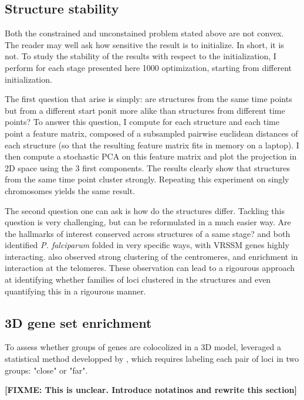 \documentclass[letterpaper,12pt]{article}
\newcommand{\fixme}[1]{\textbf{[FIXME: #1]}}
\begin{document}
\subsection*{Structure stability}

Both the constrained and unconstained problem stated above are not convex. The
reader may well ask how sensitive the result is to initialize. In short, it is
not. To study the stability of the results with respect to the initialization,
I perform for each stage presented here 1000 optimization, starting from
different initialization. 

The first question that arise is simply: are structures from the same time
points but from a different start ponit more alike than structures from
different time points? To answer this question, I compute for each structure
and each time point a feature matrix, composed of a subsampled pairwise
euclidean distances of each structure (so that the resulting feature matrix
fits in memory on a laptop). I then compute a stochastic PCA on this feature
matrix and plot the projection in 2D space using the 3 first components. The
results clearly show that structures from the same time point cluster
strongly. Repeating this experiment on singly chromosomes yields the same
result.

The second question one can ask is how do the structures differ. Tackling this
question is very challenging, but can be reformulated in a much easier way.
Are the hallmarks of interest conserved across structures of a same stage?
\citet{ay:three-dimensional} and \citet{lemieux:genome-wide} both identified
{\em P. falciparum} folded in very specific ways, with VRSSM genes highly
interacting. \citet{ay:three-dimensional} also observed strong clustering of
the centromeres, and enrichment in interaction at the telomeres. These
observation can lead to a rigourous approach at identifying whether families
of loci clustered in the structures and even quantifying this in a rigourous
manner.

\subsection*{3D gene set enrichment}

To assess whether groups of genes are colocolized in a 3D model,
\citet{ay:three-dimensional} leveraged a statistical method developped by
\citet{witten:assessment}, which requires labeling each pair of loci in two groups:
"close" or "far". 

\fixme{This is unclear. Introduce notatinos and rewrite this section}
\end{document}
